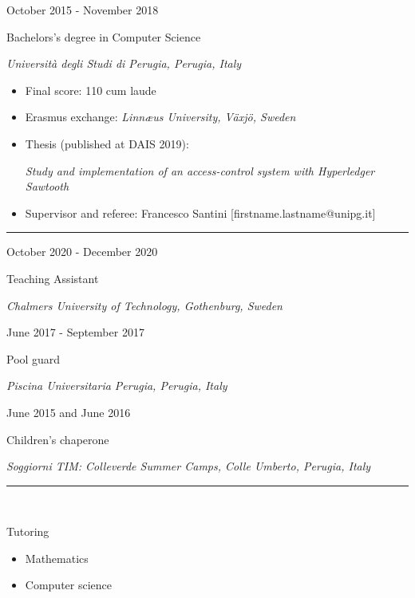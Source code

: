 \documentclass[a4paper,10pt]{article}
\newlength{\cvcolumngapwidth}
\newlength{\cvleftcolumnwidth}
\newlength{\cvrightcolumnwidth}
\newcommand{\cvsectionstyle}[1]{{\normalsize\cvsectionfont\textcolor{cvsectioncolor}{#1}}}
\newcommand{\cvtitlestyle}[1]{{\large\cvtitlefont\textcolor{cvtitlecolor}{#1}}}
\newcommand{\cvdurationstyle}[1]{{\small\cvdurationfont\textcolor{cvdurationcolor}{#1}}}
\newcommand{\cvheadingstyle}[1]{{\normalsize\cvheadingfont\textcolor{cvheadingcolor}{#1}}}
\newlength{\cvafteritemskipamount}
\newlength{\cvaftersectionskipamount}
\newlength{\cvaftertitleskipamount}
\newlength{\cvparskip}
\newcommand{\cvsection}[1]{
    \begin{minipage}[t]{\cvleftcolumnwidth}
        \raggedleft\cvsectionstyle{#1}
    \end{minipage}%
    \hspace{\cvcolumngapwidth}%
    \begin{minipage}[t]{\cvrightcolumnwidth}
        \textcolor{cvrulecolor}{\rule{\cvrightcolumnwidth}{0.3mm}}
    \end{minipage}

    \vspace{\cvaftersectionskipamount}
}
\newcommand{\cvitem}[2]{
    \begin{minipage}[t]{\cvleftcolumnwidth}
        \raggedleft #1
    \end{minipage}%
    \hspace{\cvcolumngapwidth}%
    \begin{minipage}[t]{\cvrightcolumnwidth}
        \setlength{\parskip}{\cvparskip} #2
    \end{minipage}

    \vspace{\cvafteritemskipamount}
}
\newcommand{\cvtitle}[1]{
    \cvtitlestyle{#1}

    \vspace{\cvaftertitleskipamount}
    \vspace{-\cvparskip}
}
\begin{document}
\cvitem{
    \cvdurationstyle{October 2015 - November 2018}

}{
    \cvtitle{Bachelors's degree in Computer Science}

    \textit{Università degli Studi di Perugia, Perugia, Italy}

    \begin{itemize}[leftmargin=*]
        \item Final score:
        110 cum laude
        
        \item Erasmus exchange: 
        \textit{Linnæus University, Växjö, Sweden}

        \item Thesis (published at DAIS 2019):
        
        \textit{Study and implementation of an access-control system with Hyperledger Sawtooth}

        \item Supervisor and referee:
        Francesco Santini [firstname.lastname@unipg.it]
        
    \end{itemize}
}



\cvsection{WORK EXPERIENCE}

\cvitem{
    \cvdurationstyle{October 2020 - December 2020}
}{
    \cvtitle{Teaching Assistant}
    
    \textit{Chalmers University of Technology, Gothenburg, Sweden}
}

\cvitem{
    \cvdurationstyle{June 2017 - September 2017}
}{
    \cvtitle{Pool guard}
    
    \textit{Piscina Universitaria Perugia, Perugia, Italy}
}

\cvitem{
    \cvdurationstyle{June 2015 and June 2016}
}{
    \cvtitle{Children's chaperone}

    \textit{Soggiorni TIM: Colleverde Summer Camps, Colle Umberto, Perugia, Italy}
}



\cvsection{OTHER EXPERIENCES}

\cvitem{
    \ 
}{
    \cvheadingstyle{Tutoring}
    \begin{itemize}[leftmargin=*]
        \item Mathematics
        \item Computer science
    \end{itemize}
}
\end{document}
